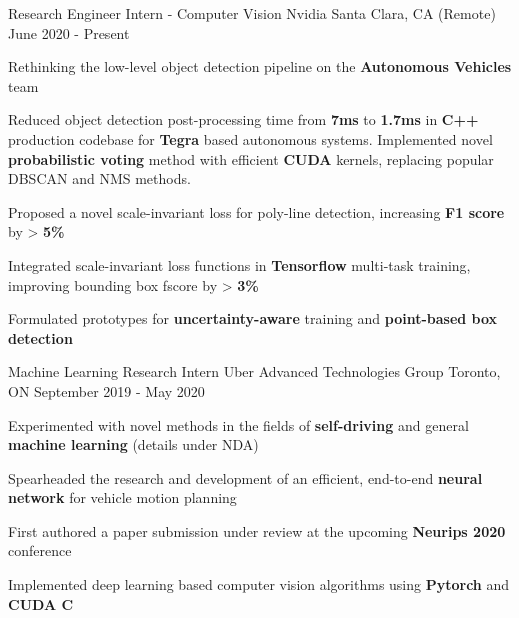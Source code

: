 
\begin{cventries}
  \cventry
    {Research Engineer Intern - Computer Vision} %
    {Nvidia} %
    {Santa Clara, CA (Remote)} %
    {June 2020 - Present} %
    {
      \begin{cvitems} %
        \item {Rethinking the low-level object detection pipeline on the \textbf{Autonomous Vehicles} team}
        \item {Reduced object detection post-processing time from \textbf{7ms} to \textbf{1.7ms} in \textbf{C++} production codebase for \textbf{Tegra} based autonomous systems. Implemented novel \textbf{probabilistic voting} method with efficient \textbf{CUDA} kernels, replacing popular DBSCAN and NMS methods.}
        \item {Proposed a novel scale-invariant loss for poly-line detection, increasing \textbf{F1 score} by > \textbf{5\%}}
        \item {Integrated scale-invariant loss functions in \textbf{Tensorflow} multi-task training, improving bounding box fscore by > \textbf{3\%}}
        \item {Formulated prototypes for \textbf{uncertainty-aware} training and \textbf{point-based box detection}}
      \end{cvitems}
    }

  \cventry
    {Machine Learning Research Intern} %
    {Uber Advanced Technologies Group} %
    {Toronto, ON} %
    {September 2019 - May 2020} %
    {
      \begin{cvitems} %
        \item {Experimented with novel methods in the fields of \textbf{self-driving} and general \textbf{machine learning} (details under NDA)}
        \item {Spearheaded the research and development of an efficient, end-to-end \textbf{neural network} for vehicle motion planning}
        \item {First authored a paper submission under review at the upcoming \textbf{Neurips 2020} conference}
        \item {Implemented deep learning based computer vision algorithms using \textbf{Pytorch} and \textbf{CUDA C}}
      \end{cvitems}
    }


\end{cventries}
